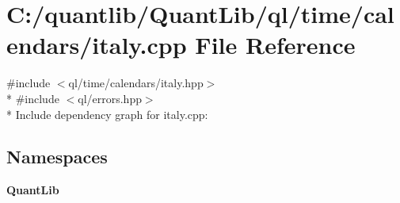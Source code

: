 \section{C\+:/quantlib/\+Quant\+Lib/ql/time/calendars/italy.cpp File Reference}
\label{italy_8cpp}
{\ttfamily \#include $<$ql/time/calendars/italy.\+hpp$>$}\\*
{\ttfamily \#include $<$ql/errors.\+hpp$>$}\\*
Include dependency graph for italy.\+cpp\+:
\subsection*{Namespaces}
\begin{DoxyCompactItemize}
\item 
 {\bf Quant\+Lib}
\end{DoxyCompactItemize}

